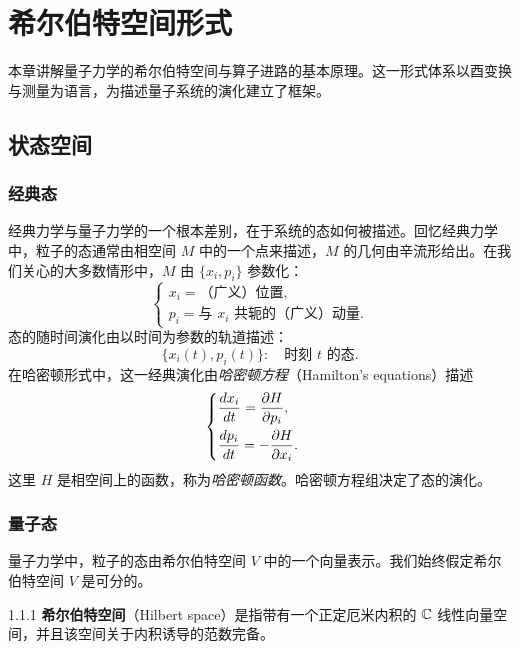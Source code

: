 
\chapter{希尔伯特空间形式}

本章讲解量子力学的希尔伯特空间与算子进路的基本原理。这一形式体系以酉变换与测量为语言，为描述量子系统的演化建立了框架。

\section{状态空间}

\subsection{经典态}

经典力学与量子力学的一个根本差别，在于系统的态如何被描述。回忆经典力学中，粒子的态通常由相空间 $M$ 中的一个点来描述，$M$ 的几何由辛流形给出。在我们关心的大多数情形中，$M$ 由 $\{x_i,p_i\}$ 参数化：
\[
\begin{cases}
x_i=\text{（广义）位置},\\
p_i=\text{与 } x_i \text{ 共轭的（广义）动量}.
\end{cases}
\]
态的随时间演化由以时间为参数的轨道描述：
\[
\{x_i(t),p_i(t)\}:\quad \text{时刻 } t \text{ 的态}.
\]
在哈密顿形式中，这一经典演化由\emph{哈密顿方程}（Hamilton's equations）描述
\[
\begin{cases}
\dfrac{d x_i}{d t}=\dfrac{\partial H}{\partial p_i},\\[3mm]
\dfrac{d p_i}{d t}=-\dfrac{\partial H}{\partial x_i}.
\end{cases}
\]
这里 $H$ 是相空间上的函数，称为\emph{哈密顿函数}。哈密顿方程组决定了态的演化。

\subsection{量子态}

量子力学中，粒子的态由希尔伯特空间 $V$ 中的一个向量表示。我们始终假定希尔伯特空间 $V$ 是可分的。

\begin{definition}{1.1.1}
  \textbf{希尔伯特空间}（Hilbert space）是指带有一个正定厄米内积的 $\mathbb{C}$ 线性向量空间，并且该空间关于内积诱导的范数完备。
\end{definition}

